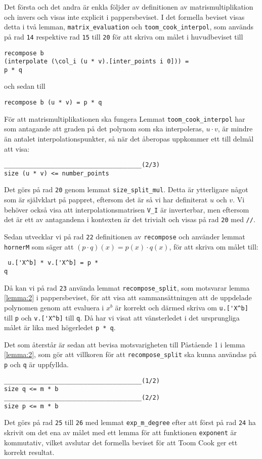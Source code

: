 Det första och det andra är enkla följder av definitionen av
matrismultiplikation och invers och visas inte explicit i pappersbeviset. I det
formella beviset visas detta i två lemman, \verb=matrix_evaluation= och
\verb=toom_cook_interpol=, som används på rad \verb+14+ respektive rad
\verb+15+ till \verb+20+ för att skriva om målet i huvudbeviset till
\begin{verbatim}
recompose b
(interpolate (\col_i (u * v).[inter_points i 0])) =
p * q
\end{verbatim}
och sedan till
\begin{verbatim}
recompose b (u * v) = p * q
\end{verbatim}
För att matrismultiplikationen ska fungera Lemmat \verb=toom_cook_interpol= har
som antagande att graden på det polynom som ska interpoleras, $u \cdot v$, är
mindre än antalet interpolationspunkter, så när det åberopas uppkommer ett till
delmål att visa:
\begin{verbatim}
______________________________________(2/3)
size (u * v) <= number_points
\end{verbatim}
Det görs på rad \verb+20+ genom lemmat \verb=size_split_mul=. Detta är
ytterligare något som är självklart på pappret, eftersom det är så vi har
definiterat $u$ och $v$. Vi behöver också visa att interpolationsmatrisen
\verb=V_I= är inverterbar, men eftersom det är ett av antagandena i kontexten
är det trivialt och visas på rad \verb+20+ med \verb=//=.

Sedan utvecklar vi på rad \verb+22+ definitionen av \verb=recompose= och
använder lemmat \verb=hornerM= som säger att $(p \cdot q)(x) = p(x) \cdot
q(x)$, för att skriva om målet till: \begin{verbatim} u.['X^b] * v.['X^b] = p *
q \end{verbatim} Då kan vi på rad \verb+23+ använda lemmat
\verb=recompose_split=, som motsvarar lemma \ref{lemma:2} i pappersbeviset, för
att visa att sammansättningen att de uppdelade polynomen genom att evaluera i
$x^b$ är korrekt och därmed skriva om \verb=u.['X^b]= till \verb=p= och
\verb=v.['X^b]= till \verb=q=. Då har vi visat att vänsterledet i det
ursprungliga målet är lika med högerledet \verb+p * q+.

Det som återstår är sedan att bevisa motsvarigheten till Påstående 1 i lemma
\ref{lemma:2}, som gör att villkoren för att \verb=recompose_split= ska kunna
användas på \verb+p+ och \verb+q+ är uppfyllda.
\begin{verbatim}
______________________________________(1/2)
size q <= m * b
______________________________________(2/2)
size p <= m * b
\end{verbatim}
Det görs på rad \verb+25+ till \verb+26+ med lemmat \verb=exp_m_degree= efter
att först på rad \verb+24+ ha skrivit om det ena av målet med ett lemma för att
funktionen \verb=exponent= är kommutativ, vilket avslutar det formella beviset
för att Toom Cook ger ett korrekt resultat.

